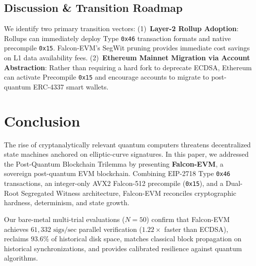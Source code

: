 \documentclass[a4paper,fleqn]{cas-dc}
\begin{document}
\subsection{Discussion \& Transition Roadmap}
We identify two primary transition vectors:
(1)~\textbf{Layer-2 Rollup Adoption}: Rollups can immediately deploy Type \texttt{0x46} transaction formats and native precompile \texttt{0x15}. Falcon-EVM's SegWit pruning provides immediate cost savings on L1 data availability fees.
(2)~\textbf{Ethereum Mainnet Migration via Account Abstraction}: Rather than requiring a hard fork to deprecate ECDSA, Ethereum can activate Precompile \texttt{0x15} and encourage accounts to migrate to post-quantum ERC-4337 smart wallets.

\section{Conclusion}
\label{sec:conclusion}
The rise of cryptanalytically relevant quantum computers threatens decentralized state machines anchored on elliptic-curve signatures. In this paper, we addressed the Post-Quantum Blockchain Trilemma by presenting \textbf{Falcon-EVM}, a sovereign post-quantum EVM blockchain. Combining EIP-2718 Type \texttt{0x46} transactions, an integer-only AVX2 Falcon-512 precompile (\texttt{0x15}), and a Dual-Root Segregated Witness architecture, Falcon-EVM reconciles cryptographic hardness, determinism, and state growth. 

Our bare-metal multi-trial evaluations ($N = 50$) confirm that Falcon-EVM achieves \textbf{$61,332\text{ sigs/sec}$} parallel verification ($1.22\times$ faster than ECDSA), reclaims \textbf{$93.6\%$} of historical disk space, matches classical block propagation on historical synchronizations, and provides calibrated resilience against quantum algorithms.
\end{document}
